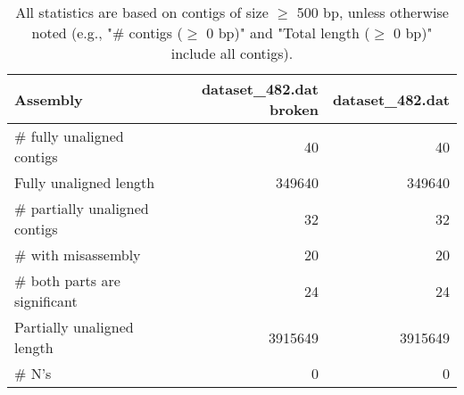 \documentclass[12pt,a4paper]{article}
\begin{document}
\begin{table}[ht]
\begin{center}
\caption{All statistics are based on contigs of size $\geq$ 500 bp, unless otherwise noted (e.g., "\# contigs ($\geq$ 0 bp)" and "Total length ($\geq$ 0 bp)" include all contigs).}
\begin{tabular}{|l*{2}{|r}|}
\hline
Assembly & dataset\_482.dat broken & dataset\_482.dat \\ \hline
\# fully unaligned contigs & 40 & 40 \\ \hline
Fully unaligned length & 349640 & 349640 \\ \hline
\# partially unaligned contigs & 32 & 32 \\ \hline
\hspace{5mm}\# with misassembly & 20 & 20 \\ \hline
\hspace{5mm}\# both parts are significant & 24 & 24 \\ \hline
Partially unaligned length & 3915649 & 3915649 \\ \hline
\# N's & 0 & 0 \\ \hline
\end{tabular}
\end{center}
\end{table}
\end{document}
